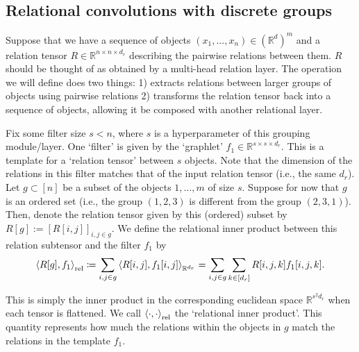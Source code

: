 \newcommand{\softreliprod}[3]{\left\langle #1, #2 \, \vert \, #3 \right\rangle_\mathrm{rel}}
\newcommand{\reliprod}[2]{\left\langle #1, #2 \right\rangle_\mathrm{rel}}

\subsection{Relational convolutions with discrete groups}
Suppose that we have a sequence of objects $(x_1, ..., x_n) \in (\mathbb{R}^{d})^m$ and a relation tensor $R \in \mathbb{R}^{n \times n \times d_r}$ describing the pairwise relations between them. $R$ should be thought of as obtained by a multi-head relation layer. The operation we will define does two things: 1) extracts relations between larger groups of objects using pairwise relations 2) transforms the relation tensor back into a sequence of objects, allowing it be composed with another relational layer.

Fix some filter size $s < n$, where $s$ is a hyperparameter of this grouping module/layer. One `filter' is given by the `graphlet' $f_1 \in \mathbb{R}^{s \times s \times d_r}$. This is a template for a `relation tensor' between $s$ objects. Note that the dimension of the relations in this filter matches that of the input relation tensor (i.e., the same $d_r$). Let $g \subset [n]$ be a subset of the objects $1, \ldots, m$ of size $s$. Suppose for now that $g$ is an ordered set (i.e., the group $(1, 2, 3)$ is different from the group $(2, 3, 1)$). Then, denote the relation tensor given by this (ordered) subset by $R[g] := [R[i,j]]_{i,j \in g}$. We define the relational inner product between this relation subtensor and the filter $f_1$ by
\begin{equation}
    \label{eq:relational_inner_prod_one_filt}
    \reliprod{R[g]}{f_1} \coloneqq \sum_{i,j \in g} \iprod{R[i,j]}{f_1[i,j]}_{\reals^{d_r}} = \sum_{i,j \in g} \sum_{k \in [d_r]} R[i,j,k] f_1[i,j,k].
\end{equation}

This is simply the inner product in the corresponding euclidean space $\mathbb{R}^{s^2 d_r}$ when each tensor is flattened. We call $\left \langle \cdot, \cdot \right\rangle_{\mathrm{rel}}$ the `relational inner product'. This quantity represents how much the relations within the objects in $g$ match the relations in the template $f_1$.


